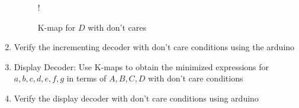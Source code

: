 \begin{enumerate}[label=\arabic*.,ref=\theenumi]
\begin{figure}[H]
\resizebox {\columnwidth} {!} {

}
\caption{K-map for $D$ with don't cares}
\label{fig:kmap_D_x}
\end{figure}
%
\item Verify the incrementing decoder with don't care conditions using the arduino
\item {Display Decoder:}
Use K-maps to obtain the minimized expressions for $a,b,c,d,e,f,g$ in terms of $A,B,C,D$ with  don't care conditions
\item Verify the display decoder with don't care conditions using arduino
\end{enumerate}




